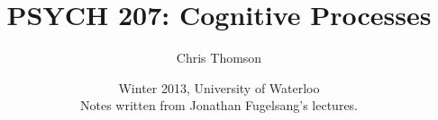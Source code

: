 \documentclass[]{article}
\begin{document}
\title{\bf{PSYCH 207: Cognitive Processes}}
\date{Winter 2013, University of Waterloo \\ \center Notes written from Jonathan Fugelsang's lectures.}
\author{Chris Thomson}
\maketitle
\newpage
\end{document}
